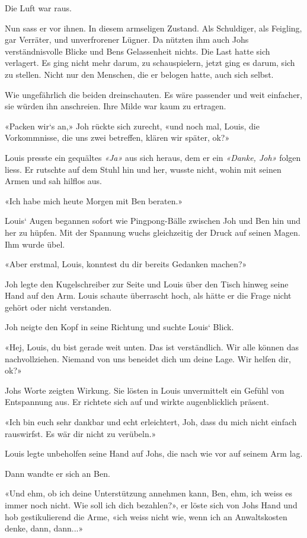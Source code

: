 Die Luft war raus.

Nun sass er vor ihnen. In diesem armseligen Zustand. Als Schuldiger, als
Feigling, gar Verräter, und unverfrorener Lügner. Da nützten ihm auch
Johs verständnisvolle Blicke und Bens Gelassenheit nichts. Die Last
hatte sich verlagert. Es ging nicht mehr darum, zu schauspielern, jetzt
ging es darum, sich zu stellen. Nicht nur den Menschen, die er belogen
hatte, auch sich selbst.

Wie ungefährlich die beiden dreinschauten. Es wäre passender und weit
einfacher, sie würden ihn anschreien. Ihre Milde war kaum zu ertragen.

«Packen wir`s an,» Joh rückte sich zurecht, «und noch mal, Louis, die
Vorkommnisse, die uns zwei betreffen, klären wir später, ok?»

Louis presste ein gequältes \emph{«Ja»} aus sich heraus, dem er ein
\emph{«Danke, Joh»} folgen liess. Er rutschte auf dem Stuhl hin und her,
wusste nicht, wohin mit seinen Armen und sah hilflos aus.

«Ich habe mich heute Morgen mit Ben beraten.»

Louis` Augen begannen sofort wie Pingpong-Bälle zwischen Joh und Ben hin
und her zu hüpfen. Mit der Spannung wuchs gleichzeitig der Druck auf
seinen Magen. Ihm wurde übel.

«Aber erstmal, Louis, konntest du dir bereits Gedanken machen?»

Joh legte den Kugelschreiber zur Seite und Louis über den Tisch hinweg
seine Hand auf den Arm. Louis schaute überrascht hoch, als hätte er die
Frage nicht gehört oder nicht verstanden.

Joh neigte den Kopf in seine Richtung und suchte Louis` Blick.

«Hej, Louis, du bist gerade weit unten. Das ist verständlich. Wir alle
können das nachvollziehen. Niemand von uns beneidet dich um deine Lage.
Wir helfen dir, ok?»

Johs Worte zeigten Wirkung. Sie lösten in Louis unvermittelt ein Gefühl
von Entspannung aus. Er richtete sich auf und wirkte augenblicklich
präsent.

«Ich bin euch sehr dankbar und echt erleichtert, Joh, dass du mich nicht
einfach rauswirfst. Es wär dir nicht zu verübeln.»

Louis legte unbeholfen seine Hand auf Johs, die nach wie vor auf seinem
Arm lag.

Dann wandte er sich an Ben.

«Und ehm, ob ich deine Unterstützung annehmen kann, Ben, ehm, ich weiss
es immer noch nicht. Wie soll ich dich bezahlen?», er löste sich von
Johs Hand und hob gestikulierend die Arme, «ich weiss nicht wie, wenn
ich an Anwaltskosten denke, dann, dann...»

